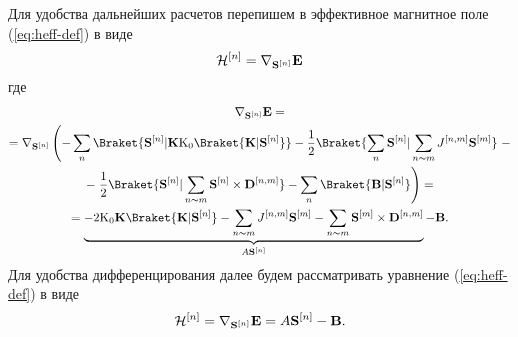 Для удобства дальнейших расчетов перепишем в эффективное магнитное поле
(\ref{eq:heff-def}) в виде
\begin{equation}
    \mathcal{H}^{[n]} = \nabla_{\mathbf S^{[n]}}\mathbf{E}
\end{equation}
где
\begin{multline}
    \nabla_{\mathbf S^{[n]}}\mathbf E
    =\\=
    \nabla_{\mathbf S^{[n]}} \left({%
    -\sum_n \Braket{\mathbf S^{[n]} | \mathbf K \mathrm{K_0}\Braket{\mathbf K |
    \mathbf S^{[n]}}} - \frac12 \Braket{\sum_n \mathbf S^{[n]} |
    \sum_{n\thicksim m} J^{[n,m]}\mathbf S^{[m]}}
    }\right.-\\-\left.{%
    \frac12\Braket{\mathbf S^{[n]} | \sum_{n\thicksim m} \mathbf S^{[n]} \times
    \mathbf D^{[n,m]}}
    -
    \sum_n \Braket{\mathbf B | \mathbf S^{[n]}}
    }\right)
    =\\=
    \underbrace{%
    -2\mathrm{K_0}\mathbf K \Braket{\mathbf K | \mathbf S^{[n]}}
    -
    \sum_{n\thicksim m}J^{[n,m]}\mathbf S^{[m]} - \sum_{n\thicksim m}
    \mathbf S^{[m]}\times \mathbf D^{[n,m]}
    }_{A\mathbf S^{[n]}}
    -
    \mathbf B.
\end{multline}
Для удобства дифференцирования далее будем рассматривать уравнение
(\ref{eq:heff-def}) в виде
\begin{equation}
    \mathcal{H}^{[n]}=\nabla_{\mathbf S^{[n]}}\mathbf E = A\mathbf S^{[n]} - \mathbf B.
\end{equation}
